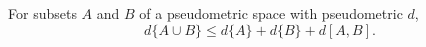 For subsets $A$ and $B$ of a pseudometric space with pseudometric $d$,
$$d\{A \cup B\} \leq d\{A\} + d\{B\} + d[A, B].$$
